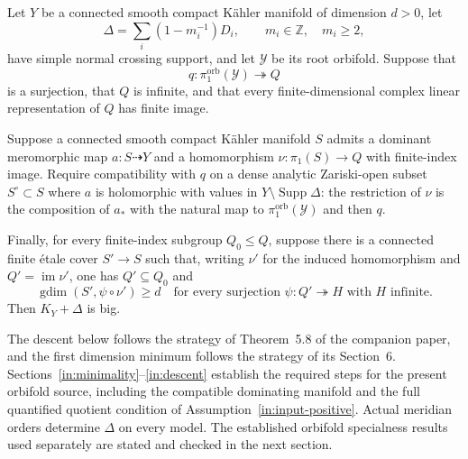 \begin{assumption}\label{in:input-positive}
Let $Y$ be a connected smooth compact K\"ahler manifold of dimension
$d>0$, let
\[
 \Delta=\sum_i(1-m_i^{-1})D_i,
 \qquad m_i\in\mathbb Z,\quad m_i\ge2,
\]
have simple normal crossing support, and let $\mathcal Y$ be its root
orbifold.  Suppose that
\[
 q:\pi_1^{\mathrm{orb}}(\mathcal Y)\twoheadrightarrow Q
\]
is a surjection, that $Q$ is infinite, and that every finite-dimensional
complex linear representation of $Q$ has finite image.

Suppose a connected smooth compact K\"ahler manifold $S$ admits a
dominant meromorphic map $a:S\dashrightarrow Y$ and a homomorphism
$\nu:\pi_1(S)\to Q$ with finite-index image.  Require compatibility
with $q$ on a dense analytic Zariski-open subset $S^\circ\subset S$
where $a$ is holomorphic with values in $Y\setminus\operatorname{Supp}
\Delta$: the restriction of $\nu$ is the composition of $a_*$ with
the natural map to $\pi_1^{\mathrm{orb}}(\mathcal Y)$ and then $q$.

Finally, for every finite-index subgroup $Q_0\le Q$, suppose there is a
connected finite \'etale cover $S'\to S$ such that, writing $\nu'$ for
the induced homomorphism and $Q'=\operatorname{im}\nu'$, one has
$Q'\subseteq Q_0$ and
\[
 \operatorname{gdim}(S',\psi\circ\nu')\ge d
 \quad\text{for every surjection }\psi:Q'\twoheadrightarrow H
 \text{ with }H\text{ infinite}.
\]
Then $K_Y+\Delta$ is big.
\end{assumption}

The descent below follows the strategy of Theorem~5.8 of the companion paper,
and the first dimension minimum follows the strategy of its Section~6.
Sections~\ref{in:minimality}--\ref{in:descent} establish the required
steps for the present orbifold source, including the compatible
dominating manifold and the full quantified quotient condition of
Assumption~\ref{in:input-positive}. Actual meridian orders determine
$\Delta$ on every model. The established orbifold specialness results
used separately are stated and checked in the next section.
